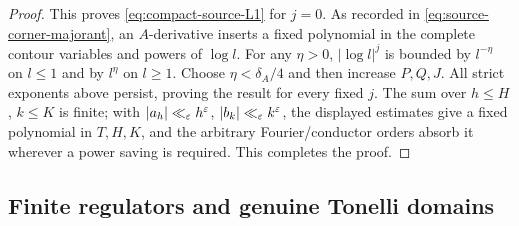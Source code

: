 \begin{proof}
This proves \eqref{eq:compact-source-L1} for $j=0$.  As recorded in
\eqref{eq:source-corner-majorant}, an $A$-derivative inserts a fixed
polynomial in the complete contour variables and powers of $\log l$.  For
any $\eta>0$, $|\log l|^j$ is bounded by $l^{-\eta}$ on $l\leq1$ and by
$l^\eta$ on $l\geq1$.  Choose $\eta<\delta_A/4$ and then increase $P,Q,J$.
All strict exponents
above persist, proving the result for every fixed $j$.  The sum over
$h\leq H$, $k\leq K$ is finite; with
$|a_h|\ll_\varepsilon h^\varepsilon$, $|b_k|\ll_\varepsilon k^\varepsilon$, the displayed estimates
give a fixed polynomial in $T,H,K$, and the arbitrary Fourier/conductor
orders absorb it wherever a power saving is required.  This completes the
proof.
\end{proof}

\subsection{Finite regulators and genuine Tonelli domains}

